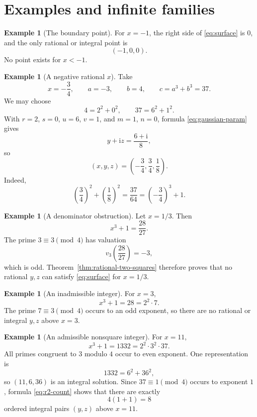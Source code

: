 \documentclass[11pt,a4paper]{article}
\numberwithin{equation}{section}
\theoremstyle{definition}
\newtheorem{example}[theorem]{Example}
\newcommand{\ii}{\mathrm{i}}
\begin{document}
\section{Examples and infinite families}

\begin{example}[The boundary point]
For $x=-1$, the right side of \eqref{eq:surface} is $0$, and the only rational or integral point is
\[
 (-1,0,0).
\]
No point exists for $x<-1$.
\end{example}

\begin{example}[A negative rational $x$]
Take
\[
 x=-\frac34,
 \qquad
 a=-3,
 \qquad
 b=4,
 \qquad
 c=a^3+b^3=37.
\]
We may choose
\[
 4=2^2+0^2,
 \qquad
 37=6^2+1^2.
\]
With $r=2$, $s=0$, $u=6$, $v=1$, and $m=1$, $n=0$, formula \eqref{eq:gaussian-param} gives
\[
 y+\ii z=\frac{6+\ii}{8},
\]
so
\[
 \left(x,y,z\right)=
 \left(-\frac34,\frac34,\frac18\right).
\]
Indeed,
\[
 \left(\frac34\right)^2+\left(\frac18\right)^2
 =\frac{37}{64}
 =\left(-\frac34\right)^3+1.
\]
\end{example}

\begin{example}[A denominator obstruction]
Let $x=1/3$. Then
\[
 x^3+1=\frac{28}{27}.
\]
The prime $3\equiv3\pmod4$ has valuation
\[
 v_3\!\left(\frac{28}{27}\right)=-3,
\]
which is odd. Theorem~\ref{thm:rational-two-squares} therefore proves that no rational $y,z$ can satisfy \eqref{eq:surface} for $x=1/3$.
\end{example}

\begin{example}[An inadmissible integer]
For $x=3$,
\[
 x^3+1=28=2^2\cdot7.
\]
The prime $7\equiv3\pmod4$ occurs to an odd exponent, so there are no rational or integral $y,z$ above $x=3$.
\end{example}

\begin{example}[An admissible nonsquare integer]
For $x=11$,
\[
 x^3+1=1332=2^2\cdot3^2\cdot37.
\]
All primes congruent to $3$ modulo $4$ occur to even exponent. One representation is
\[
 1332=6^2+36^2,
\]
so $(11,6,36)$ is an integral solution. Since $37\equiv1\pmod4$ occurs to exponent $1$, formula \eqref{eq:r2-count} shows that there are exactly
\[
 4(1+1)=8
\]
ordered integral pairs $(y,z)$ above $x=11$.
\end{example}
\end{document}
